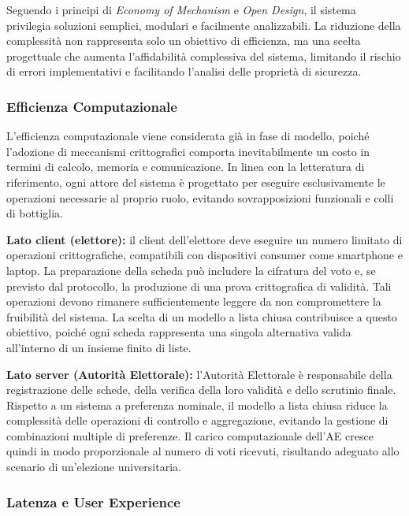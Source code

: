 \documentclass[12pt,a4paper]{article}
\begin{document}
Seguendo i principi di \textit{Economy of Mechanism} e \textit{Open Design}, il sistema
privilegia soluzioni semplici, modulari e facilmente analizzabili. La riduzione della
complessità non rappresenta solo un obiettivo di efficienza, ma una scelta progettuale che
aumenta l'affidabilità complessiva del sistema, limitando il rischio di errori implementativi e
facilitando l'analisi delle proprietà di sicurezza.

\subsubsection{Efficienza Computazionale}

L'efficienza computazionale viene considerata già in fase di modello, poiché l'adozione di
meccanismi crittografici comporta inevitabilmente un costo in termini di calcolo, memoria e
comunicazione. In linea con la letteratura di riferimento, ogni attore del sistema è progettato
per eseguire esclusivamente le operazioni necessarie al proprio ruolo, evitando sovrapposizioni
funzionali e colli di bottiglia.

\textbf{Lato client (elettore):} il client dell'elettore deve eseguire un numero limitato di
operazioni crittografiche, compatibili con dispositivi consumer come smartphone e laptop. La
preparazione della scheda può includere la cifratura del voto e, se previsto dal protocollo, la
produzione di una prova crittografica di validità. Tali operazioni devono rimanere
sufficientemente leggere da non compromettere la fruibilità del sistema. La scelta di un modello
a lista chiusa contribuisce a questo obiettivo, poiché ogni scheda rappresenta una singola
alternativa valida all'interno di un insieme finito di liste.

\textbf{Lato server (Autorità Elettorale):} l'Autorità Elettorale è responsabile della
registrazione delle schede, della verifica della loro validità e dello scrutinio finale.
Rispetto a un sistema a preferenza nominale, il modello a lista chiusa riduce la complessità
delle operazioni di controllo e aggregazione, evitando la gestione di combinazioni multiple di
preferenze. Il carico computazionale dell'AE cresce quindi in modo proporzionale al numero di
voti ricevuti, risultando adeguato allo scenario di un'elezione universitaria.

\subsubsection{Latenza e User Experience}
\end{document}
